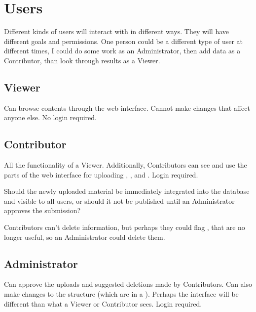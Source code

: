\section{Users}

Different kinds of users will interact with \phycomb in different ways.
They will have different goals and permissions.
One person could be a different type of user at different times, \eg I could do some work as an Administrator, then add data as a Contributor, than look through results as a Viewer.

\subsection{Viewer}

Can browse \phycomb contents through the web interface.
Cannot make changes that affect anyone else.
No login required.

\subsection{Contributor}
\label{sec:users_contributor}

All the functionality of a Viewer.
Additionally, Contributors can see and use the parts of the web interface for uploading \Elements, \Methods, and \Performance.
Login required.

Should the newly uploaded material be immediately integrated into the database and visible to all users, or should it not be published until an Administrator approves the submission?

Contributors can't delete information, but perhaps they could flag \Elements, \etc that are no longer useful, so an Administrator could delete them.

\subsection{Administrator}

Can approve the uploads and suggested deletions made by Contributors.
Can also make changes to the structure (\eg which \Elements are in a \Benchmark).
Perhaps the interface will be different than what a Viewer or Contributor sees.
Login required.
